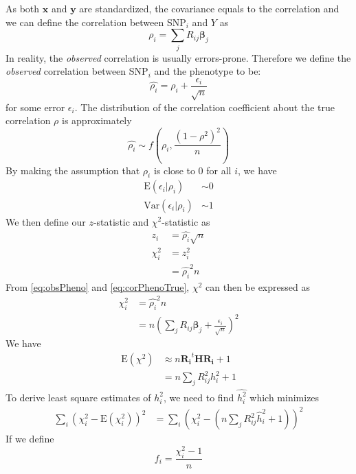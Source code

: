 			As both $\boldsymbol{x}$ and $\boldsymbol{y}$ are standardized, the covariance equals to the correlation and we can define the correlation between \gls{SNP}$_i$ and $Y$ as
			\begin{equation}
				\rho_i = \sum_j{R_{ij}\boldsymbol{\beta}_j}
				\label{eq:corPhenoTrue}
			\end{equation}
			In reality, the \emph{observed} correlation is usually errors-prone. 
			Therefore we define the \emph{observed} correlation between \gls{SNP}$_i$ and the phenotype to be:
			\begin{equation}
			\hat{\rho_i} = \rho_i+\frac{\epsilon_i}{\sqrt{n}}
			\label{eq:obsPheno}
			\end{equation}
			for some error $\epsilon_i$. 
			The distribution of the correlation coefficient about the true correlation $\rho$ is approximately
			$$
				\hat{\rho_i}\sim f(\rho_i, \frac{(1-\rho^2)^2}{n})
			$$
			By making the assumption that $\rho_i$ is close to 0 for all $i$, we have 
			\begin{align*}
				\mathrm{E}(\epsilon_i|\rho_i)&\sim 0\\
				\mathrm{Var}(\epsilon_i|\rho_i)&\sim 1
			\end{align*}
			We then define our $z$-statistic and $\chi^2$-statistic as
			\begin{align*}
				z_i &= \hat{\rho_i}\sqrt{n} \\
				\chi^2_i &= z_i^2\\
				&=\hat{\rho_i}^2n
			\end{align*}
			From \cref{eq:obsPheno} and \cref{eq:corPhenoTrue}, $\chi^2$ can then be expressed as
			\begin{align*}
			\chi^2_i&=\hat{\rho_i}^2n\\
			&=n(\sum_j{R_{ij}\boldsymbol{\beta}_j}+\frac{\epsilon_i}{\sqrt{n}})^2
			\end{align*}
			We have
			\begin{align*}
			\mathrm{E}(\chi^2) &\approx n\boldsymbol{R_i}^t\boldsymbol{HR_i}+1 \nonumber\\
			&=n\sum_j{R^2_{ij}h_i^2}+1
			\end{align*}
			To derive least square estimates of $h_i^2$, we need to find $\hat{h_i^2}$ which minimizes
			\begin{align*}
				\sum_i(\chi_i^2-\mathrm{E}(\chi_i^2))^2&=\sum_i(\chi_i^2-(n\sum_j{R^2_{ij}\hat{h}_i^2}+1))^2
			\end{align*}
			If we define 
			\begin{equation}
			f_i= \frac{\chi_i^2-1}{n}
			\label{eq:defineF}
			\end{equation}

